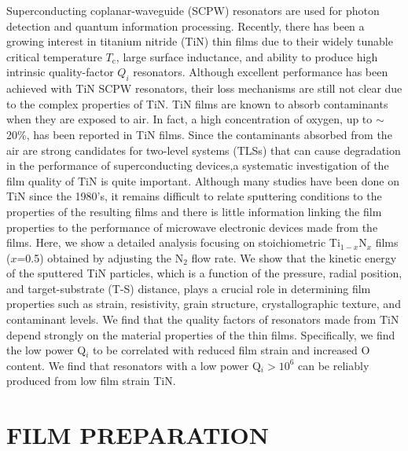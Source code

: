 \documentclass{report}
\begin{document}
Superconducting coplanar-waveguide (SCPW) resonators are used for photon detection and quantum information processing. Recently, there has been a growing interest in titanium nitride (TiN) thin films due to their widely tunable critical temperature $T_{\text{c}}$, large surface inductance, and ability to produce high intrinsic quality-factor $Q_{i}$ resonators.\cite{Leduc2010, Vissers2010, Sage2011, Vissers2012, Diener2012, Mazin2012, Cecil2012, Noroozian2012, Calvo2012, Eom2012, Krocknberger2012, Driessen2012} Although excellent performance has been achieved with TiN SCPW resonators, their loss mechanisms are still not clear due to the complex properties of TiN.  TiN films are known to absorb contaminants when they are exposed to air.\cite{Kumar1988, Mandl1990,Logothetidis1999} In fact, a high concentration of oxygen, up to $\sim$20\%, has been reported in TiN films.\cite{Chowdhury1996, Chappe2007, Radecka2011} Since the contaminants absorbed from the air are strong candidates for two-level systems (TLSs) that can cause degradation in the performance of superconducting devices,\cite{Martinis2005}a systematic investigation of the film quality of TiN is quite important. Although many studies have been done on TiN since the 1980's, it remains difficult to relate sputtering conditions to the properties of the resulting films and there is little information linking the film properties to the performance of microwave electronic devices made from the films. Here, we show a detailed analysis focusing on stoichiometric Ti$_{1-x}$N$_{x}$ films ($x$=0.5) obtained by adjusting the N$_{2}$ flow rate.  We show that the kinetic energy of the sputtered TiN particles, which is a function of the pressure, radial position, and target-substrate (T-S) distance, plays a crucial role in determining film properties such as strain, resistivity, grain structure, crystallographic texture, and contaminant levels.  We find that the quality factors of resonators made from TiN depend strongly on the material properties of the thin films.  Specifically, we find the low power Q$_{i}$ to be correlated with reduced film strain and increased O content.  We find that resonators with a low power Q$_{i} > 10^{6}$ can be reliably produced from low film strain TiN.

\section{FILM PREPARATION}
\end{document}
